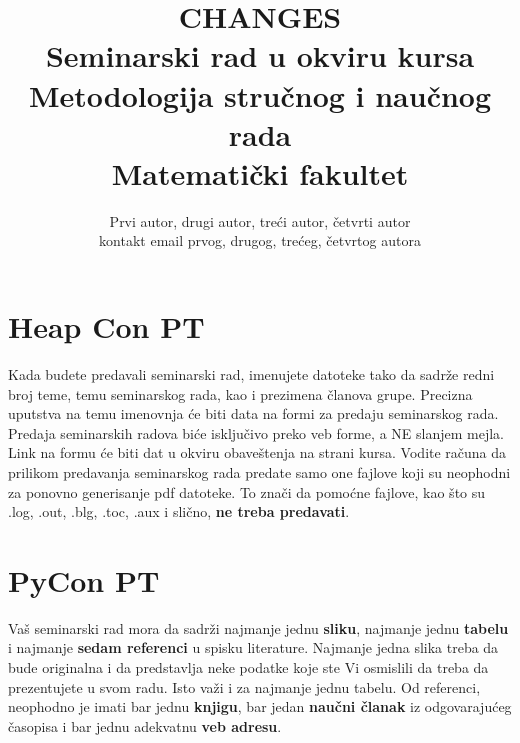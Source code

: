 \documentclass[a4paper]{article}
\begin{document}
\title{CHANGES\\ \small{Seminarski rad u okviru kursa\\Metodologija stručnog i naučnog rada\\ Matematički fakultet}}

\author{Prvi autor, drugi autor, treći autor, četvrti autor\\ kontakt email prvog, drugog, trećeg, četvrtog autora}


\maketitle


\tableofcontents

\newpage

\section{Heap Con PT}
\label{sec:uvod}

Kada budete predavali seminarski rad, imenujete datoteke tako da sadrže redni broj teme, temu seminarskog rada, kao i prezimena članova grupe. Precizna uputstva na temu imenovnja će biti data na formi za predaju seminarskog rada. Predaja seminarskih radova biće isključivo preko veb forme, a NE slanjem mejla. Link na formu će biti dat u okviru obaveštenja na strani kursa. Vodite računa da prilikom predavanja seminarskog rada predate samo one fajlove koji su neophodni za ponovno generisanje pdf datoteke. To znači da pomoćne fajlove, kao što su .log, .out, .blg, .toc, .aux i slično, \textbf{ne treba predavati}.

\section{PyCon PT}
Vaš seminarski rad mora da sadrži najmanje jednu \textbf{sliku}, najmanje jednu \textbf{tabelu} i najmanje \textbf{sedam referenci} u spisku literature. Najmanje jedna slika treba da bude originalna i da predstavlja neke podatke koje ste Vi osmislili da treba da prezentujete u svom radu. Isto važi i za najmanje jednu tabelu. 	Od referenci, neophodno je imati bar jednu \textbf{knjigu}, bar jedan \textbf{naučni članak} iz odgovarajućeg časopisa i bar jednu adekvatnu \textbf{veb adresu}. 
\end{document}
